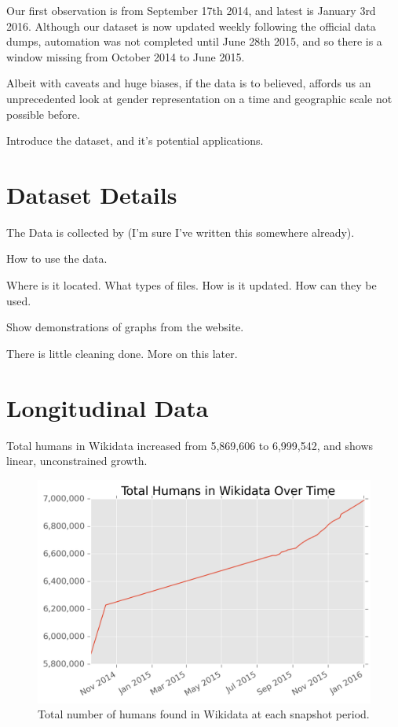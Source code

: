 \documentclass[letterpaper]{article}
\begin{document}
Our first observation is from September 17th 2014, and latest is January 3rd 2016. Although our dataset is now updated weekly following the official data dumps, automation was not completed until June 28th 2015, and so there is a window missing from October 2014 to June 2015. 

Albeit with caveats and huge biases, if the data is to believed, affords us an unprecedented look at gender representation on a time and geographic scale not possible before.

Introduce the dataset, and it's potential applications.	
\section{Dataset Details}

The Data is collected by (I'm sure I've written this somewhere already).


How to use the data.

Where is it located.
What types of files.
How is it updated.
How can they be used. 

Show demonstrations of graphs from the website.

There is little cleaning done. More on this later.

\section{Longitudinal Data}
Total humans in Wikidata increased from 5,869,606 to 6,999,542, and shows linear, unconstrained growth.
\begin{figure}
\label{fig:totalhumans}
\includegraphics[scale=0.6]{figures/totalhumans.png} 
\caption{Total number of humans found in Wikidata at each snapshot period.}
\end{figure}
\end{document}
